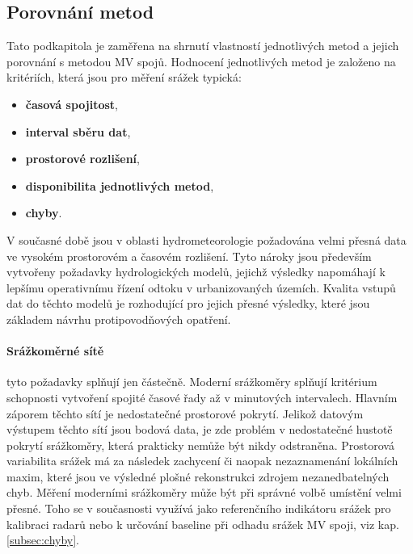 \documentclass[a4paper,12pt,oneside]{report}
\begin{document}
\subsection{Porovnání metod}
Tato podkapitola je zaměřena na shrnutí vlastností jednotlivých metod
a jejich porovnání s metodou MV spojů. Hodnocení jednotlivých metod je
založeno na kritériích, která jsou pro měření srážek typická:
\begin{itemize}
\item\textbf{časová spojitost},
\item\textbf{interval sběru dat},
\item\textbf{prostorové rozlišení},
\item\textbf{disponibilita jednotlivých metod},
\item\textbf{chyby}.
\end{itemize}
V současné době jsou v oblasti hydrometeorologie požadována velmi
přesná data ve vysokém prostorovém a časovém rozlišení. Tyto nároky
jsou především vytvořeny požadavky hydrologických modelů, jejichž
výsledky napomáhají k lepšímu operativnímu řízení odtoku v
urbanizovaných územích. Kvalita vstupů dat do těchto modelů je
rozhodující pro jejich přesné výsledky, které jsou základem
návrhu protipovodňových opatření.

\paragraph*{Srážkoměrné sítě} 
tyto požadavky splňují jen částečně. Moderní srážkoměry splňují
kritérium schopnosti vytvoření spojité časové řady až v minutových
intervalech. Hlavním záporem těchto sítí je nedostatečné prostorové pokrytí. 
Jelikož datovým výstupem těchto sítí jsou bodová data, je zde
problém v nedostatečné hustotě pokrytí srážkoměry, která prakticky
nemůže být nikdy odstraněna. Prostorová variabilita  srážek
 má za následek zachycení či naopak nezaznamenání lokálních maxim, které jsou ve
výsledné plošné rekonstrukci zdrojem nezanedbatelných chyb. Měření
moderními srážkoměry může být při správné volbě umístění velmi
přesné. Toho se v současnosti využívá jako referenčního indikátoru
srážek pro kalibraci radarů nebo k určování baseline při odhadu
srážek MV spoji, viz kap. \ref{subsec:chyby}.
\end{document}
